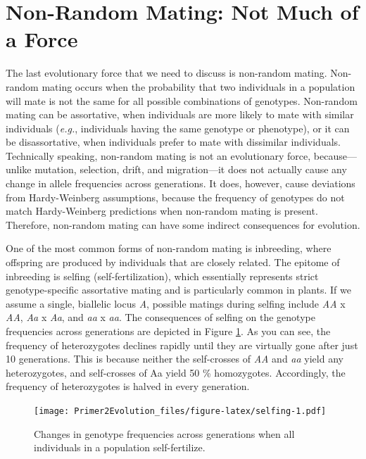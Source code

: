 \documentclass[
]{book}
\begin{document}
\hypertarget{non-random-mating-not-much-of-a-force}{%
\section{Non-Random Mating: Not Much of a Force}\label{non-random-mating-not-much-of-a-force}}

The last evolutionary force that we need to discuss is non-random mating. Non-random mating occurs when the probability that two individuals in a population will mate is not the same for all possible combinations of genotypes. Non-random mating can be assortative, when individuals are more likely to mate with similar individuals (\emph{e.g.}, individuals having the same genotype or phenotype), or it can be disassortative, when individuals prefer to mate with dissimilar individuals. Technically speaking, non-random mating is not an evolutionary force, because---unlike mutation, selection, drift, and migration---it does not actually cause any change in allele frequencies across generations. It does, however, cause deviations from Hardy-Weinberg assumptions, because the frequency of genotypes do not match Hardy-Weinberg predictions when non-random mating is present. Therefore, non-random mating can have some indirect consequences for evolution.

One of the most common forms of non-random mating is inbreeding, where offspring are produced by individuals that are closely related. The epitome of inbreeding is selfing (self-fertilization), which essentially represents strict genotype-specific assortative mating and is particularly common in plants. If we assume a single, biallelic locus \emph{A}, possible matings during selfing include \emph{AA} x \emph{AA}, \emph{Aa} x \emph{Aa}, and \emph{aa} x \emph{aa}. The consequences of selfing on the genotype frequencies across generations are depicted in Figure \ref{fig:selfing}. As you can see, the frequency of heterozygotes declines rapidly until they are virtually gone after just 10 generations. This is because neither the self-crosses of \emph{AA} and \emph{aa} yield any heterozygotes, and self-crosses of Aa yield 50 \% homozygotes. Accordingly, the frequency of heterozygotes is halved in every generation.

\begin{figure}
\centering
\texttt{[image: Primer2Evolution\_files/figure-latex/selfing-1.pdf]}
\caption{\label{fig:selfing}Changes in genotype frequencies across generations when all individuals in a population self-fertilize.}
\end{figure}
\end{document}
